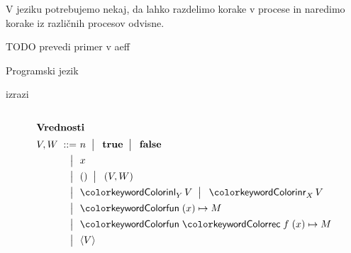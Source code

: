 \documentclass{beamer}
\theoremstyle{definition} %
\theoremstyle{plain} %
\begin{document}
	\begin{frame}[fragile]{\aeff{}}
		V jeziku potrebujemo nekaj, da lahko razdelimo korake v procese in naredimo korake iz različnih procesov odvisne.
		
		
		TODO prevedi primer v aeff
		
		Programski jezik 
		
		
	\end{frame}

	\begin{frame}{izrazi}
		
		\begin{columns}[T]
			\begin{column}{0.27\textwidth}
				\begin{figure}[hp]
					\parbox{\textwidth}{
						\centering
						\tiny
						\begin{align*}
						\intertext{\textbf{Vrednosti}}
						V, W
						\bnfis& n \bnfor\! \true \bnfor\! \false        \\
						\bnfor& x                                       \\
						\bnfor& \tmunit \bnfor\! \tmpair{V}{W}          \\
						\bnfor& \tminl[Y]{V} \bnfor\! \tminr[X]{V}      \\
						\bnfor& \tmfun{x}{M}                        \\
						\bnfor& \tmfunrec{f}{x}{M}                   \\
						\bnfor& \tmpromise V                           
						\end{align*}
					} 
				\end{figure}
			\end{column}
		

\end{columns}
\end{frame}
\end{document}
